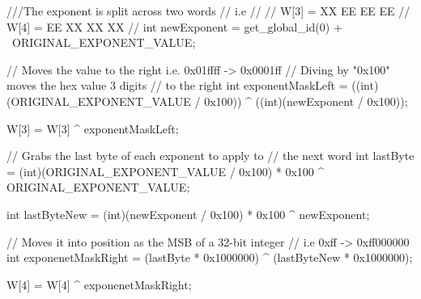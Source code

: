 \begin{adjustbox}{width=\textwidth,height=15cm,keepaspectratio}
\begin{Code}[OpenCLStyle]
///The exponent is split across two words
// i.e
//
// W[3] = XX EE EE EE
// W[4] = EE XX XX XX
//
int newExponent = get_global_id(0) + \
                    ORIGINAL_EXPONENT_VALUE;

// Moves the value to the right i.e. 0x01ffff -> 0x0001ff
// Diving by "0x100" moves the hex value 3 digits
// to the right
int exponentMaskLeft = ((int)(ORIGINAL_EXPONENT_VALUE / 0x100)) ^ ((int)(newExponent / 0x100));

W[3] = W[3] ^ exponentMaskLeft;

// Grabs the last byte of each exponent to apply to 
// the next word
int lastByte = (int)(ORIGINAL_EXPONENT_VALUE / 0x100) *
    0x100 ^ ORIGINAL_EXPONENT_VALUE;

int lastByteNew = (int)(newExponent / 0x100) * 0x100 ^ newExponent;

// Moves it into position as the MSB of a 32-bit integer 
// i.e 0xff -> 0xff000000
int exponenetMaskRight = (lastByte * 0x1000000) ^ 
    (lastByteNew * 0x1000000);

W[4] = W[4] ^ exponenetMaskRight;
\end{Code}
\end{adjustbox}